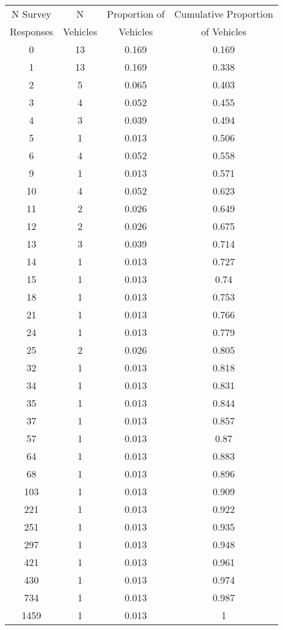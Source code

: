 \begin{tabular}{cccc} 
\hline 
N Survey  & N        & Proportion of & Cumulative Proportion \\ 
Responses & Vehicles & Vehicles      & of Vehicles \\ 
\hline 
0 & 13 & 0.169 & 0.169 \\ 
  1 & 13 & 0.169 & 0.338 \\ 
  2 & 5 & 0.065 & 0.403 \\ 
  3 & 4 & 0.052 & 0.455 \\ 
  4 & 3 & 0.039 & 0.494 \\ 
  5 & 1 & 0.013 & 0.506 \\ 
  6 & 4 & 0.052 & 0.558 \\ 
  9 & 1 & 0.013 & 0.571 \\ 
  10 & 4 & 0.052 & 0.623 \\ 
  11 & 2 & 0.026 & 0.649 \\ 
  12 & 2 & 0.026 & 0.675 \\ 
  13 & 3 & 0.039 & 0.714 \\ 
  14 & 1 & 0.013 & 0.727 \\ 
  15 & 1 & 0.013 & 0.74 \\ 
  18 & 1 & 0.013 & 0.753 \\ 
  21 & 1 & 0.013 & 0.766 \\ 
  24 & 1 & 0.013 & 0.779 \\ 
  25 & 2 & 0.026 & 0.805 \\ 
  32 & 1 & 0.013 & 0.818 \\ 
  34 & 1 & 0.013 & 0.831 \\ 
  35 & 1 & 0.013 & 0.844 \\ 
  37 & 1 & 0.013 & 0.857 \\ 
  57 & 1 & 0.013 & 0.87 \\ 
  64 & 1 & 0.013 & 0.883 \\ 
  68 & 1 & 0.013 & 0.896 \\ 
  103 & 1 & 0.013 & 0.909 \\ 
  221 & 1 & 0.013 & 0.922 \\ 
  251 & 1 & 0.013 & 0.935 \\ 
  297 & 1 & 0.013 & 0.948 \\ 
  421 & 1 & 0.013 & 0.961 \\ 
  430 & 1 & 0.013 & 0.974 \\ 
  734 & 1 & 0.013 & 0.987 \\ 
  1459 & 1 & 0.013 & 1 \\ 
 \hline 
\end{tabular} 
